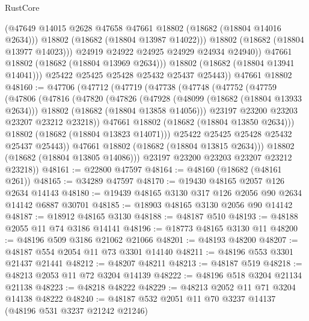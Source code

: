 \begin{lexlean}{RustCore}
\begin{coremodule}
                    (@47649 @14015 @2628 @47658 @47661 @18802 (@18682 (@18804 @14016 @2634)))
                    @18802
                    (@18682 (@18804 @13987 @14022)))
                  @18802
                  (@18682 (@18804 @13977 @14023)))
                @24919
                @24922
                @24925
                @24929
                @24934
                @24940))
            @47661
            @18802
            (@18682 (@18804 @13969 @2634)))
          @18802
          (@18682 (@18804 @13941 @14041)))
        @25422
        @25425
        @25428
        @25432
        @25437
        @25443))
    @47661
    @18802
@48160 := @47706
    (@47712
      (@47719
        (@47738
          (@47748
            (@47752
              (@47759
                (@47806
                  (@47816
                    (@47820
                      (@47826
                        (@47928
                          (@48099 (@18682 (@18804 @13933 @2634)))
                          @18802
                          (@18682 (@18804 @13858 @14056)))
                        @23197
                        @23200
                        @23203
                        @23207
                        @23212
                        @23218))
                    @47661
                    @18802
                    (@18682 (@18804 @13850 @2634)))
                  @18802
                  (@18682 (@18804 @13823 @14071)))
                @25422
                @25425
                @25428
                @25432
                @25437
                @25443))
            @47661
            @18802
            (@18682 (@18804 @13815 @2634)))
          @18802
          (@18682 (@18804 @13805 @14086)))
        @23197
        @23200
        @23203
        @23207
        @23212
        @23218))
@48161 := @22800 @47597
@48164 := @48160 (@18682 (@48161 @261))
@48165 := @34289 @47597
@48170 := @19430 @48165 @2057 @126 @2634 @14143
@48180 := @19439 @48165 @3130 @317 @126 @2056 @90 @2634 @14142 @6887 @30701
@48185 := @18903 @48165 @3130 @2056 @90 @14142
@48187 := @18912 @48165 @3130
@48188 := @48187 @510
@48193 := @48188 @2055 @11 @74 @3186 @14141
@48196 := @18773 @48165 @3130 @11
@48200 := @48196 @509 @3186 @21062 @21066
@48201 := @48193 @48200
@48207 := @48187 @554 @2054 @11 @73 @3301 @14140
@48211 := @48196 @553 @3301 @21437 @21441
@48212 := @48207 @48211
@48213 := @48187 @519
@48218 := @48213 @2053 @11 @72 @3204 @14139
@48222 := @48196 @518 @3204 @21134 @21138
@48223 := @48218 @48222
@48229 := @48213 @2052 @11 @71 @3204 @14138 @48222
@48240 := @48187 @532 @2051 @11 @70 @3237 @14137 (@48196 @531 @3237 @21242 @21246)

\end{coremodule}
\end{lexlean}
